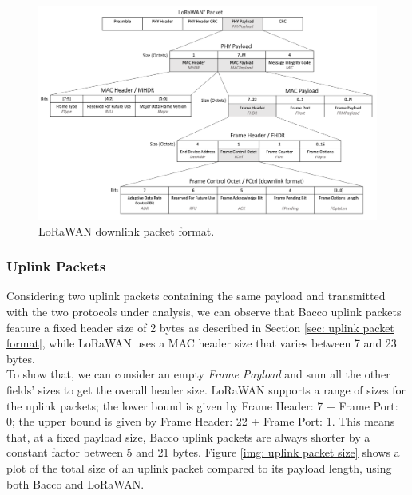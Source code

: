 \begin{figure}[ht]
    \centering
    \includegraphics[width=1.0\textwidth, trim={0 0 0 115pt}, clip]{uml/lorawan_downlink_format.pdf}
    \caption{LoRaWAN downlink packet format.}
    \label{img: lorawan downlink format}
\end{figure}

\subsubsection{Uplink Packets}
\label{subsec: bacco and lorawan uplink packet format}
Considering two uplink packets containing the same payload and transmitted with the two protocols under
analysis, we can observe that Bacco uplink packets feature a fixed header size of 2 bytes as described in Section \ref{sec:
uplink packet format}, while LoRaWAN uses a \gls{MAC} header size that varies between 7 and 23 bytes.\\
To show that, we can consider an empty \textit{Frame Payload} and sum all the other
fields' sizes to get the overall header size. LoRaWAN supports a range of sizes for the uplink packets; the lower bound
is given by Frame Header: 7 + Frame Port: 0; the upper bound is given by Frame Header: 22 + Frame Port: 1. This means
that, at a fixed payload size, Bacco uplink packets are always shorter by a constant factor between 5 and 21 bytes.
Figure \ref{img: uplink packet size} shows a plot of the total size of an uplink packet compared to its payload length,
using both Bacco and LoRaWAN.

